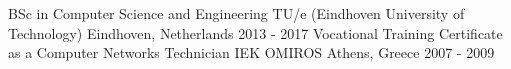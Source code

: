 

\begin{cventries}

  \cventry
    {BSc in Computer Science and Engineering} %
    {TU/e (Eindhoven University of Technology)} %
    {Eindhoven, Netherlands} %
    {2013 - 2017} %
    {
    }
  \cventry
	{Vocational Training Certificate as a Computer Networks Technician} %
	{IEK OMIROS} %
	{Athens, Greece} %
	{2007 - 2009} %
	{
	}

\end{cventries}
